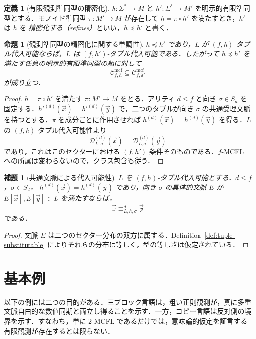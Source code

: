 \documentclass[11pt,a4paper]{ltjsarticle}
\numberwithin{equation}{section}
\theoremstyle{plain}
\newtheorem{lemma}[theorem]{補題}
\newtheorem{proposition}[theorem]{命題}
\theoremstyle{definition}
\newtheorem{definition}[theorem]{定義}
\theoremstyle{remark}
\newcommand{\Cmcf}[2]{\mathcal{C}^{\mathrm{mcf}}_{#1,#2}}
\newcommand{\D}{\mathcal{D}}
\newcommand{\tuple}[1]{\vec{#1}}
\begin{document}
\begin{definition}[有限観測準同型の精密化]
\label{def:h-refinement}
$h\colon\Sigma^*\to M$ と $h'\colon\Sigma^*\to M'$ を明示的有限準同型とする．モノイド準同型 $\pi\colon M'\to M$ が存在して $h=\pi\circ h'$ を満たすとき，$h'$ は $h$ を \emph{精密化する（refines）}といい，$h\preceq h'$ と書く．
\end{definition}

\begin{proposition}[観測準同型の精密化に関する単調性]
\label{prop:h-refinement-monotonicity}
$h\preceq h'$ であり，$L$ が $(f,h)$-タプル代入可能ならば，$L$ は $(f,h')$-タプル代入可能である．したがって $h\preceq h'$ を満たす任意の明示的有限準同型の組に対して
\[
\Cmcf{f}{h}\subseteq\Cmcf{f}{h'}
\]
が成り立つ．
\end{proposition}

\begin{proof}
$h=\pi\circ h'$ を満たす $\pi\colon M'\to M$ をとる．アリティ $d\le f$ と向き $\sigma\in S_d$ を固定する．$h'^{(d)}(\tuple x)=h'^{(d)}(\tuple y)$ で，二つのタプルが向き $\sigma$ の共通受理文脈を持つとする．$\pi$ を成分ごとに作用させれば
$h^{(d)}(\tuple x)=h^{(d)}(\tuple y)$ を得る．$L$ の $(f,h)$-タプル代入可能性より
\[
\D_{L,\sigma}^{(d)}(\tuple x)=\D_{L,\sigma}^{(d)}(\tuple y)
\]
であり，これはこのセクターにおける $(f,h')$ 条件そのものである．$f$-MCFL への所属は変わらないので，クラス包含も従う．
\end{proof}

\begin{lemma}[共通文脈による代入可能性]
\label{lem:shared-context}
$L$ を $(f,h)$-タプル代入可能とする．$d\le f$，$\sigma\in S_d$，
$h^{(d)}(\tuple x)=h^{(d)}(\tuple y)$ であり，向き $\sigma$ の具体的文脈 $E$ が
$E[\tuple x],E[\tuple y]\in L$ を満たすならば，
\[
  \tuple x\equiv_{L,h,\sigma}^d\tuple y
\]
である．
\end{lemma}

\begin{proof}
文脈 $E$ は二つのセクター分布の双方に属する．Definition~\ref{def:tuple-substitutable} によりそれらの分布は等しく，型の等しさは仮定されている．
\end{proof}

\section{基本例}
\label{sec:running-examples}

以下の例には二つの目的がある．三ブロック言語は，粗い正則観測が，真に多重文脈自由的な数値同期と両立し得ることを示す．一方，コピー言語は反対側の境界を示す．すなわち，単に $2$-MCFL であるだけでは，意味論的仮定を証言する有限観測が存在するとは限らない．
\end{document}
